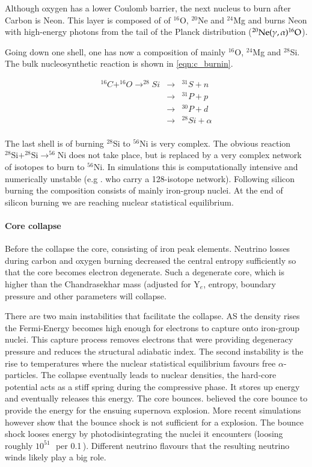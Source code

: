 Although oxygen has a lower Coulomb barrier, the next nucleus to burn after Carbon is Neon. This layer is composed of of  $^{16}$O, $^{20}$Ne and $^{24}$Mg and burns Neon with high-energy photons from the tail of the Planck distribution ($\rm ^{20}Ne(\gamma,\alpha)^{16}O$). 

Going down one shell, one has now a composition of mainly $^{16}$O, $^{24}$Mg and $^{28}$Si. The bulk nucleosynthetic reaction is shown in \ref{eqn:c_burnin}. 

\begin{eqnarray}
^{16}C+^{16}O\rightarrow^{28}Si&\rightarrow&^{31}S+n \nonumber \\
	&\rightarrow&^{31}P + p \nonumber \\
	&\rightarrow&^{30}P + d \nonumber \\
	&\rightarrow&^{28}Si + \alpha \nonumber \\
	\label{eqn:c_burning}
\end{eqnarray}

The last shell is of burning $^{28}$Si to $^{56}$Ni is very complex. The obvious reaction $^{28}\textrm{Si}+^{28}\textrm{Si}\rightarrow^{56}\textrm{Ni}$ does not take place, but is replaced by a very complex network of isotopes to burn to $^{56}\textrm{Ni}$. In simulations this is computationally intensive and numerically unstable (e.g .  \citet{1978ApJ...225.1021W} who carry a 128-isotope network). 
Following silicon burning the composition consists of mainly iron-group nuclei. 
At the end of silicon burning we are reaching nuclear statistical equilibrium. 

\paragraph{Core collapse} Before the collapse the core, consisting of iron peak elements. Neutrino losses during carbon and oxygen burning decreased the central entropy sufficiently so that the core becomes electron degenerate. Such a degenerate core, which is higher than the Chandrasekhar mass (adjusted for Y$_e$, entropy, boundary pressure and other parameters will collapse. 

There are two main instabilities that facilitate the collapse. AS the density rises the Fermi-Energy becomes high enough for electrons to capture onto iron-group nuclei. This capture process removes electrons that were providing degeneracy pressure and reduces the structural adiabatic index. 
The second instability is the rise to temperatures where the nuclear statistical equilibrium favours free $\alpha$-particles. The collapse eventually leads to nuclear densities, the hard-core potential acts as a stiff spring during the compressive phase. It stores up energy and eventually releases this energy. The core bounces.  
\citet{1985PhRvL..55..126B,1987PhRvL..59..736B} believed the core bounce to provide the energy for the ensuing supernova explosion. More recent simulations however show that the bounce shock is not sufficient for a \snii explosion. The bounce shock looses energy by photodisintegrating the nuclei it encounters (loosing roughly $10^{51}$\,\erg\ per 0.1\,\msun). Different neutrino flavours  that the resulting neutrino winds likely play a big role. 

